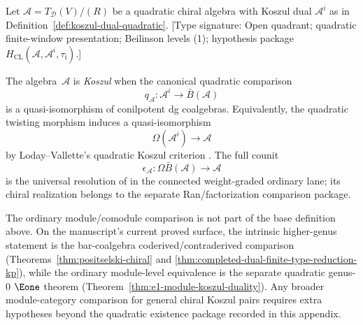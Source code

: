 \begin{definition}\label{def:koszul-property-existence}
Let $\mathcal{A} = T_{\mathcal{D}}(V)/(R)$ be a quadratic chiral algebra with
Koszul dual $\mathcal{A}^i$ as in Definition~\ref{def:koszul-dual-quadratic}.
\textup{[Type signature: Open quadrant; quadratic finite-window
presentation; Beilinson levels (1); hypothesis
package
$H_{\mathrm{CL}}(\mathcal A,\mathcal A^i,\tau_{\mathrm i})$.]}

The algebra~$\mathcal A$ is \emph{Koszul} when the canonical quadratic
comparison
\[
 q_{\mathcal A}\colon
 \mathcal A^i\longrightarrow\bar B(\mathcal A)
\]
is a quasi-isomorphism of conilpotent dg coalgebras.  Equivalently, the
quadratic twisting morphism induces a quasi-isomorphism
\[
 \Omega(\mathcal A^i)\longrightarrow\mathcal A
\]
by Loday--Vallette's quadratic Koszul criterion
\cite[Theorem~3.4.6]{LV12}.  The full counit
\[
 \epsilon_{\mathcal A}\colon
 \Omega\bar B(\mathcal A)\longrightarrow\mathcal A
\]
is the universal resolution of \cite[Corollary~2.3.4]{LV12} in the
connected weight-graded ordinary lane; its chiral realization belongs
to the separate Ran/factorization comparison package.
\end{definition}

\begin{remark}
\label{rem:existence-module-comparison-extra}
The ordinary module/comodule comparison is not part of the base
definition above. On the manuscript's current proved surface, the
intrinsic higher-genus statement is the bar-coalgebra
coderived/contraderived comparison
\textup{(}Theorems~\ref{thm:positselski-chiral} and
\ref{thm:completed-dual-finite-type-reduction-kp}\textup{)}, while the ordinary
module-level equivalence is the separate quadratic genus-$0$
$\Eone$ theorem
\textup{(}Theorem~\ref{thm:e1-module-koszul-duality}\textup{)}.
Any broader module-category comparison for general chiral Koszul pairs
requires extra hypotheses beyond the quadratic existence package
recorded in this appendix.
\end{remark}

